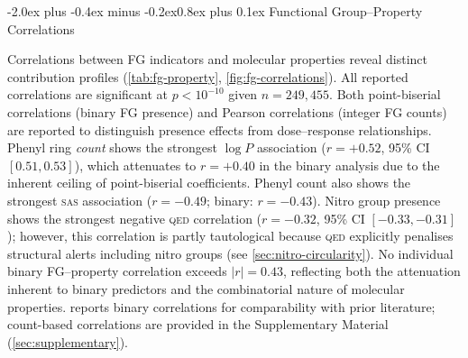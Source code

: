 \documentclass[10pt,a4paper,twocolumn]{article}
\makeatletter
\providecommand{\qed}{}
\let\qed\relax
\newcommand{\qedscore}{\textsc{qed}}
\let\qed\qedscore
\newcommand{\sas}{\textsc{sas}}
\newcommand{\logp}{\ensuremath{\log P}}
\newcommand{\abs}[1]{\ensuremath{\lvert #1 \rvert}}
\renewcommand\subsection{\@startsection{subsection}{2}{\z@}%
  {-2.0ex plus -0.4ex minus -0.2ex}{0.8ex plus 0.1ex}%
  {\normalfont\large\bfseries}}
\makeatother
\begin{document}
\subsection{Functional Group--Property Correlations}

Correlations between FG indicators and molecular properties reveal distinct contribution profiles (\cref{tab:fg-property}, \cref{fig:fg-correlations}). All reported correlations are significant at $p < 10^{-10}$ given $n = 249{,}455$. Both point-biserial correlations (binary FG presence) and Pearson correlations (integer FG counts) are reported to distinguish presence effects from dose--response relationships. Phenyl ring \emph{count} shows the strongest $\logp{}$ association ($r = +0.52$, 95\% CI $[0.51, 0.53]$), which attenuates to $r = +0.40$ in the binary analysis due to the inherent ceiling of point-biserial coefficients. Phenyl count also shows the strongest \sas{} association ($r = -0.49$; binary: $r = -0.43$). Nitro group presence shows the strongest negative \qed{} correlation ($r = -0.32$, 95\% CI $[-0.33, -0.31]$); however, this correlation is partly tautological because \qed{} explicitly penalises structural alerts including nitro groups (see \cref{sec:nitro-circularity}). No individual binary FG--property correlation exceeds $\abs{r} = 0.43$, reflecting both the attenuation inherent to binary predictors and the combinatorial nature of molecular properties.  reports binary correlations for comparability with prior literature; count-based correlations are provided in the Supplementary Material (\cref{sec:supplementary}).
\end{document}
